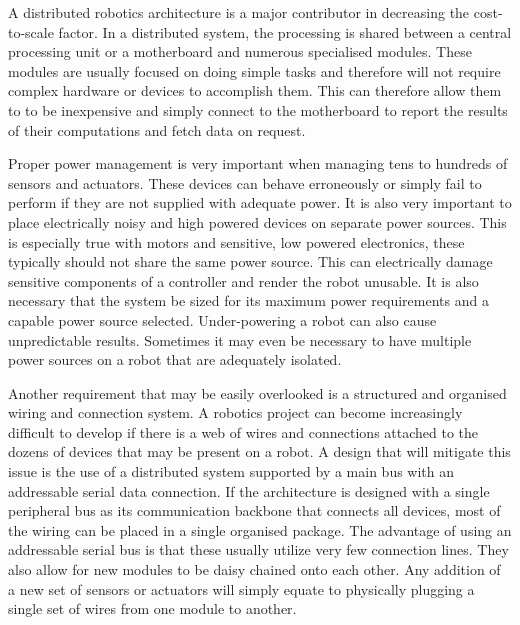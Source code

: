  A distributed robotics architecture is a major contributor in decreasing the cost-to-scale factor. In a distributed system, the processing is shared between a central processing unit or a motherboard and numerous specialised modules. These modules are usually focused on doing simple tasks and therefore will not require complex hardware or devices to accomplish them. This can therefore allow them to to be inexpensive and simply connect to the motherboard to report the results of their computations and fetch data on request.

 Proper power management is very important when managing tens to hundreds of sensors and actuators. These devices can behave erroneously or simply fail to perform if they are not supplied with adequate power. It is also very important to place electrically noisy and high powered devices on separate power sources. This is especially true with motors and sensitive, low powered electronics, these typically should not share the same power source. This can electrically damage sensitive components of a controller and render the robot unusable. It is also necessary that the system be sized for its maximum power requirements and a capable power source selected. Under-powering a robot can also cause unpredictable results. Sometimes it may even be necessary to have multiple power sources on a robot that are adequately isolated. 

Another requirement that may be easily overlooked is a structured and organised wiring and connection system. A robotics project can become increasingly difficult to develop if there is a web of wires and connections attached to the dozens of devices that may be present on a robot. A design that will mitigate this issue is the use of a distributed system supported by a main bus with an addressable serial data connection. If the architecture is designed with a single peripheral bus as its communication backbone that connects all devices, most of the wiring can be placed in a single organised package. The advantage of using an addressable serial bus is that these usually utilize very few connection lines. They also allow for new modules to be daisy chained onto each other. Any addition of a new set of sensors or actuators will simply equate to physically plugging a single set of wires from one module to another.


